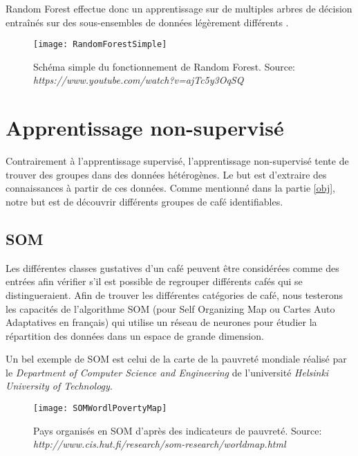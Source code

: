 \noindent Random Forest effectue donc un apprentissage sur de multiples arbres de décision entraînés sur des sous-ensembles de données légèrement différents \cite{Statistics01randomforests}.


\begin{figure}[H]
	\texttt{[image: RandomForestSimple]}
	\caption{\label{RandomForestSchema} Schéma simple du fonctionnement de Random Forest. \newline Source: \textit{https://www.youtube.com/watch?v=ajTc5y3OqSQ}}
\end{figure}


\newpage

\section{Apprentissage non-supervisé}
Contrairement à l'apprentissage supervisé, l'apprentissage non-supervisé tente de trouver des groupes dans des données hétérogènes. Le but est d'extraire des connaissances à partir de ces données. Comme mentionné dans la partie \ref{obj}, notre but est de découvrir différents groupes de café identifiables. 


\subsection{SOM}

Les différentes classes gustatives d'un café peuvent être considérées comme des entrées afin vérifier s'il est possible de regrouper différents cafés qui se distingueraient. Afin de trouver les différentes catégories de café, nous testerons les capacités de l'algorithme SOM (pour Self Organizing Map ou Cartes Auto Adaptatives en français) qui utilise un réseau de neurones pour étudier la répartition des données dans un espace de grande dimension. 

\noindent Un bel exemple de SOM est celui de la carte de la pauvreté mondiale réalisé par le \textit{Department of Computer Science and Engineering} de l'université \textit{Helsinki University of Technology}. 

\begin{figure}[H]
	\texttt{[image: SOMWordlPovertyMap]}
	\caption{\label{SOMPovertyMap} Pays organisés en SOM d'après des indicateurs de pauvreté. \newline Source: \textit{http://www.cis.hut.fi/research/som-research/worldmap.html}}
\end{figure}

